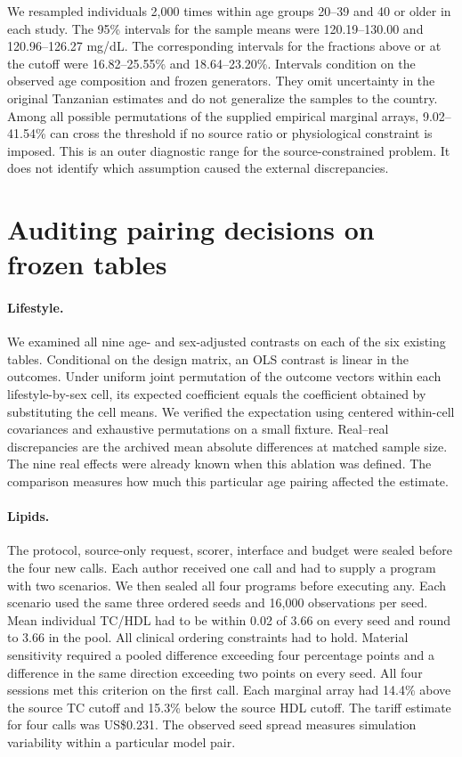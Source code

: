 We resampled individuals 2,000 times within age groups 20--39 and 40 or older in each study. The 95\% intervals for the sample means were 120.19--130.00 and 120.96--126.27 mg/dL. The corresponding intervals for the fractions above or at the cutoff were 16.82--25.55\% and 18.64--23.20\%. Intervals condition on the observed age composition and frozen generators. They omit uncertainty in the original Tanzanian estimates and do not generalize the samples to the country. Among all possible permutations of the supplied empirical marginal arrays, 9.02--41.54\% can cross the threshold if no source ratio or physiological constraint is imposed. This is an outer diagnostic range for the source-constrained problem. It does not identify which assumption caused the external discrepancies.

\section{Auditing pairing decisions on frozen tables}
\label{app:pairingtest}
\paragraph{Lifestyle.} We examined all nine age- and sex-adjusted contrasts on each of the six existing tables. Conditional on the design matrix, an OLS contrast is linear in the outcomes. Under uniform joint permutation of the outcome vectors within each lifestyle-by-sex cell, its expected coefficient equals the coefficient obtained by substituting the cell means. We verified the expectation using centered within-cell covariances and exhaustive permutations on a small fixture. Real--real discrepancies are the archived mean absolute differences at matched sample size. The nine real effects were already known when this ablation was defined. The comparison measures how much this particular age pairing affected the estimate.

\paragraph{Lipids.} The protocol, source-only request, scorer, interface and budget were sealed before the four new calls. Each author received one call and had to supply a program with two scenarios. We then sealed all four programs before executing any. Each scenario used the same three ordered seeds and 16,000 observations per seed. Mean individual TC/HDL had to be within 0.02 of 3.66 on every seed and round to 3.66 in the pool. All clinical ordering constraints had to hold. Material sensitivity required a pooled difference exceeding four percentage points and a difference in the same direction exceeding two points on every seed. All four sessions met this criterion on the first call. Each marginal array had 14.4\% above the source TC cutoff and 15.3\% below the source HDL cutoff. The tariff estimate for four calls was US\$0.231. The observed seed spread measures simulation variability within a particular model pair.

